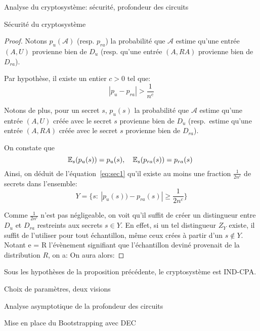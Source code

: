 \begin{section}{Analyse du cryptosystème: sécurité, profondeur des circuits}
\begin{subsection}{Sécurité du cryptosystème}
\begin{proof}
		Notons $p_{u}(\mathcal{A})$ (resp. $p_{ra}$) la probabilité que $\mathcal{A}$
		estime qu'une entrée $(A,U)$ provienne bien de $D_{u}$ (resp.
		qu'une entrée $(A, RA)$ provienne bien de $D_{ra}$).

		Par hypothèse, il existe un entier $c > 0$ tel que:
		\begin{equation} |p_u - p_{ra}| > \frac{1}{n^c}\label{eq:sec1}\end{equation}

		Notons de plus, pour un secret $s$,  $p_{u}(s)$ la probabilité
		que $\mathcal{A}$ estime qu'une entrée $(A,U)$ créée avec le
		secret $s$ provienne bien de $D_{u}$ (resp.\ estime qu'une
		entrée $(A,RA)$ créée  avec le secret $s$ provienne bien de 
		$D_{ra}$).

		On constate que \[\EE_s(p_u(s)) = p_u(s), \quad \EE_s(p_{ra}(s))
				  = p_{ra}(s) \]
		Ainsi, on déduit de l'équation~\eqref{eq:sec1} qu'il existe 
		au moins une fraction $\frac{1}{2n^c}$ de secrets dans
		l'ensemble:
		\[ Y = \{ s : \:|p_u(s)) - p_{ra}(s)| \geq \frac{1}{2n^c}\} \]
	
		Comme $\frac{1}{2n^c}$ n'est pas négligeable, on voit qu'il
		suffit de créer un distingueur entre $D_{u}$ et $D_{ra}$ 
		restreints aux secrets $s\in Y$. En effet, si un tel
		distingueur $Z_{Y}$ existe, il suffit de l'utiliser pour 
		tout échantillon, même ceux crées à partir d'un $s \not\in Y$.
		Notant \og e = R \fg l'évènement signifiant
		que l'échantillon deviné provenait de la distribution $R$, on
		a:
		On aura alors:



	\end{proof}
	\begin{thm}
	Sous les hypothèses de la proposition précédente, le
	cryptosystème est IND-CPA.
	\end{thm}
	\end{subsection}
	\begin{subsection}{Choix de paramètres, deux visions}
	\end{subsection}
	\begin{subsection}{Analyse asymptotique de la profondeur des circuits}
	\end{subsection}
	\begin{subsection}{Mise en place du Bootstrapping avec DEC}
	\end{subsection}
\end{section}

